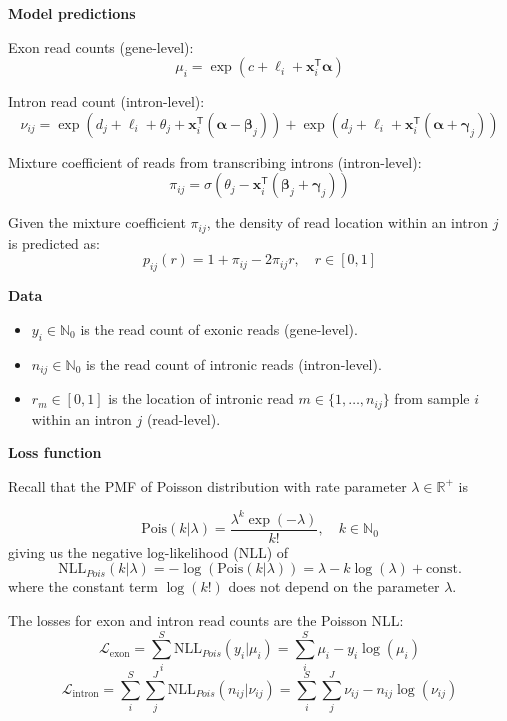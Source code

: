 \documentclass{article}
\begin{document}
	\textbf{Model predictions}
	
	Exon read counts (gene-level):	
	$$
	\mu_i =  \exp \left( c + \ell_i +\mathbf{x}_i^\mathsf{T} \boldsymbol{\alpha} \right)
	$$
	
	Intron read count (intron-level):	
	$$
	\nu_{ij} = \exp \left(d_j + \ell_i + \theta_j + \mathbf{x}_i^\mathsf{T} \left( \boldsymbol{\alpha} - \boldsymbol{\beta}_j \right) \right) + \exp \left( d_j + \ell_i + \mathbf{x}_i^\mathsf{T} \left( \boldsymbol{\alpha} + \boldsymbol{\gamma}_j \right) \right)
	$$
	
	Mixture coefficient of reads from transcribing introns (intron-level):	
	$$
	\pi_{ij} = \sigma \left( \theta_j -\mathbf{x}_i^\mathsf{T} \left( \boldsymbol{\beta}_j + \boldsymbol{\gamma}_j \right) \right)
	$$
	
	Given the mixture coefficient $\pi_{ij}$, the density of read location within an intron $j$ is predicted as:	
	$$
	p_{ij}(r) = 1 +\pi_{ij} -2\pi_{ij} r, \quad r \in [0,1]
	$$
	
	\textbf{Data}
	
	\begin{itemize}
		
		
		\item $y_{i} \in \mathbb{N}_0$ is the read count of exonic reads (gene-level).
		\item $n_{ij} \in \mathbb{N}_0$ is the read count of intronic reads (intron-level).
		\item $r_m \in [0,1]$ is the location of intronic read $m \in \{1,\ldots,n_{ij}\}$ from sample $i$ within an intron $j$ (read-level).
	\end{itemize}	
	
	\textbf{Loss function}
	
	Recall that the PMF of Poisson distribution with rate parameter $\lambda \in \mathbb{R}^+ $ is
	
	$$
	\text{Pois}(k|\lambda) = \frac{\lambda^k \exp(-\lambda)}{k!}, \quad k \in \mathbb{N}_0
	$$
	giving us the negative log-likelihood (NLL) of
	$$
	\text{NLL}_{Pois}(k|\lambda) = -\log \left( \text{Pois}(k|\lambda) \right) = \lambda - k \log(\lambda) + \text{const.}
	$$
	where the constant term $\log(k!)$ does not depend on the parameter $\lambda$.
	
	The losses for exon and intron read counts are the Poisson NLL:
	$$
	\mathcal{L}_{\text{exon}} = \sum_{i}^{S} \text{NLL}_{Pois}(y_i|\mu_i) = \sum_{i}^{S}
	\mu_i - y_i\log \left (\mu_i \right)
	$$
	$$
	\mathcal{L}_{\text{intron}} = \sum_{i}^{S} \sum_{j}^{J} \text{NLL}_{Pois}(n_{ij}|\nu_{ij}) = 
	\sum_{i}^{S} \sum_{j}^{J} \nu_{ij} - n_{ij}\log \left (\nu_{ij} \right)
	$$	
	
\end{document}
